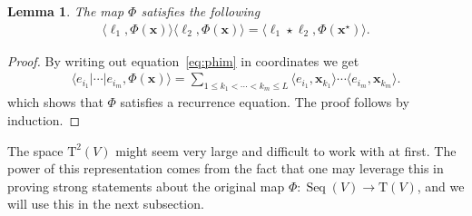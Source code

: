 \documentclass{article} \usepackage{iclr2021_conference,times}
\def\eqref#1{equation~\ref{#1}}
\newcommand{\bx}{\mathbf{x}}
\newcommand{\T}[1]{\mathrm{T}({#1})}
\newcommand{\Tra}[2]{\mathrm{T}^{{#1}}({#2})}
\newcommand{\Seq}[1]{\operatorname{Seq}(#1)}
\theoremstyle{plain}
\newtheorem{lemma}[thm]{Lemma}
\theoremstyle{definition}
\begin{document}
	\begin{lemma} \label{lem:shuff}
		The map $ \Phi $ satisfies the following
		\begin{align}
		\langle \ell_1, \Phi(\bx) \rangle \langle \ell_2, \Phi(\bx) \rangle = \langle \ell_1\star \ell_2, \Phi(\bx^\star) \rangle.
		\end{align}
	\end{lemma}
	\begin{proof}
		By writing out \eqref{eq:phim} in coordinates we get
		\begin{align}
		\langle e_{i_1} \vert \cdots \vert e_{i_m}, \Phi(\bx) \rangle = \sum_{1 \leq k_1 < \cdots < k_m \leq L} \langle e_{i_1}, \bx_{k_1} \rangle \cdots \langle e_{i_m}, \bx_{k_m} \rangle.
		\end{align}
	which shows that $ \Phi $ satisfies a recurrence equation.
The proof follows by induction.
\end{proof}





	The space $ \Tra{2}{V} $ might seem very large and difficult to work with at first. The power of this representation comes from the fact that one may leverage this in proving strong statements about the original map $ \Phi : \Seq{V} \to \T{V} $, and we will use this in the next subsection.
	 
\end{document}
